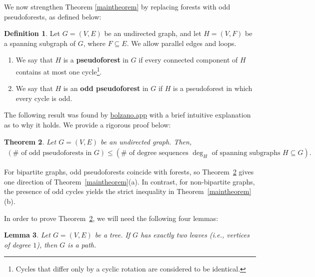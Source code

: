\documentclass[12pt]{article}
\newtheorem{theorem}{Theorem}[section]
\newtheorem{lemma}[theorem]{Lemma}
\theoremstyle{definition}
\newtheorem{definition}[theorem]{Definition}
\theoremstyle{remark}
\newcommand{\tup}[1]{\left( #1 \right)}
\begin{document}
We now strengthen Theorem \ref{maintheorem} by replacing forests with odd pseudoforests, as defined below:

\begin{definition}
    Let $G=(V,E)$ be an undirected graph, and let $H=(V,F)$ be a spanning subgraph of $G$, where $F \subseteq E$. We allow parallel edges and loops.
    \begin{enumerate}
        \item We say that $H$ is a \textbf{pseudoforest} in $G$ if every connected component of $H$ contains at most one cycle\footnote{Cycles that differ only by a cyclic rotation are considered to be identical.}.
        \item We say that $H$ is an \textbf{odd pseudoforest} in $G$ if $H$ is a pseudoforest in which every cycle is odd.
    \end{enumerate}
\end{definition}

The following result was found by \url{bolzano.app} \cite{Bolzano26} with a brief intuitive explanation as to why it holds. We provide a rigorous proof below: 
\begin{theorem}\label{pseudoforests_theorem}
    Let $G=(V,E)$ be an undirected graph. Then, \begin{align*}
        \tup{\# \text{ of odd pseudoforests in $G$}} \leq \tup{\# \text{ of degree sequences $\deg_H$ of spanning subgraphs $H \subseteq G$}}.
    \end{align*}
\end{theorem}

For bipartite graphs, odd pseudoforests coincide with forests, so Theorem~\ref{pseudoforests_theorem} gives one direction of Theorem~\ref{maintheorem}(a).
In contrast, for non-bipartite graphs, the presence of odd cycles yields the strict inequality in Theorem~\ref{maintheorem}(b).

In order to prove Theorem~\ref{pseudoforests_theorem}, we will need the following four lemmas:

\begin{lemma}\label{two_leaves_path}
   Let $G=(V,E)$ be a tree. If $G$ has exactly two leaves (i.e., vertices of degree $1$), then $G$ is a path.
\end{lemma}
\end{document}
